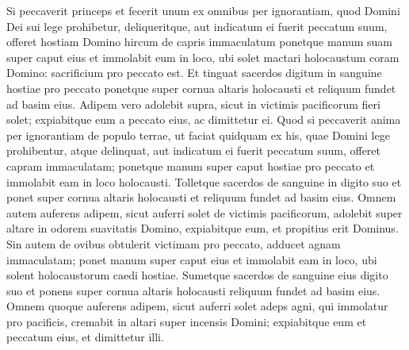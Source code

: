 \begin{biblechapter}
\verse Si peccaverit princeps et fecerit unum ex omnibus per ignorantiam, quod Domini Dei sui lege prohibetur, deliqueritque, 
\verse aut indicatum ei fuerit peccatum suum, offeret hostiam Domino hircum de capris immaculatum 
\verse ponetque manum suam super caput eius et immolabit eum in loco, ubi solet mactari holocaustum coram Domino: sacrificium pro peccato est. 
\verse Et tinguat sacerdos digitum in sanguine hostiae pro peccato ponetque super cornua altaris holocausti et reliquum fundet ad basim eius. 
\verse Adipem vero adolebit supra, sicut in victimis pacificorum fieri solet; expiabitque eum a peccato eius, ac dimittetur ei. 
\verse Quod si peccaverit anima per ignorantiam de populo terrae, ut faciat quidquam ex his, quae Domini lege prohibentur, atque delinquat, 
\verse aut indicatum ei fuerit peccatum suum, offeret capram immaculatam; 
\verse ponetque manum super caput hostiae pro peccato et immolabit eam in loco holocausti. 
\verse Tolletque sacerdos de sanguine in digito suo et ponet super cornua altaris holocausti et reliquum fundet ad basim eius. 
\verse Omnem autem auferens adipem, sicut auferri solet de victimis pacificorum, adolebit super altare in odorem suavitatis Domino, expiabitque eum, et propitius erit Dominus. 
\verse Sin autem de ovibus obtulerit victimam pro peccato, adducet agnam immaculatam; 
\verse ponet manum super caput eius et immolabit eam in loco, ubi solent holocaustorum caedi hostiae. 
\verse Sumetque sacerdos de sanguine eius digito suo et ponens super cornua altaris holocausti reliquum fundet ad basim eius. 
\verse Omnem quoque auferens adipem, sicut auferri solet adeps agni, qui immolatur pro pacificis, cremabit in altari super incensis Domini; expiabitque eum et peccatum eius, et dimittetur illi. 
\end{biblechapter}

